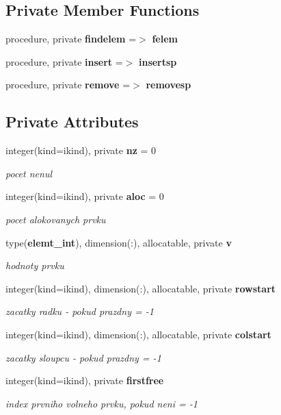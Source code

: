 \subsection*{Private Member Functions}
\begin{DoxyCompactItemize}
\item 
procedure, private {\bf findelem} =$>$ {\bf felem}
\item 
procedure, private {\bf insert} =$>$ {\bf insertsp}
\item 
procedure, private {\bf remove} =$>$ {\bf removesp}
\end{DoxyCompactItemize}
\subsection*{Private Attributes}
\begin{DoxyCompactItemize}
\item 
integer(kind=ikind), private {\bf nz} = 0
\begin{DoxyCompactList}\small\item\em pocet nenul \end{DoxyCompactList}\item 
integer(kind=ikind), private {\bf aloc} = 0
\begin{DoxyCompactList}\small\item\em pocet alokovanych prvku \end{DoxyCompactList}\item 
type({\bf elemt\+\_\+int}), dimension(\+:), allocatable, private {\bf v}
\begin{DoxyCompactList}\small\item\em hodnoty prvku \end{DoxyCompactList}\item 
integer(kind=ikind), dimension(\+:), allocatable, private {\bf rowstart}
\begin{DoxyCompactList}\small\item\em zacatky radku -\/ pokud prazdny = -\/1 \end{DoxyCompactList}\item 
integer(kind=ikind), dimension(\+:), allocatable, private {\bf colstart}
\begin{DoxyCompactList}\small\item\em zacatky sloupcu -\/ pokud prazdny = -\/1 \end{DoxyCompactList}\item 
integer(kind=ikind), private {\bf firstfree}
\begin{DoxyCompactList}\small\item\em index prvniho volneho prvku, pokud neni = -\/1 \end{DoxyCompactList}\end{DoxyCompactItemize}


